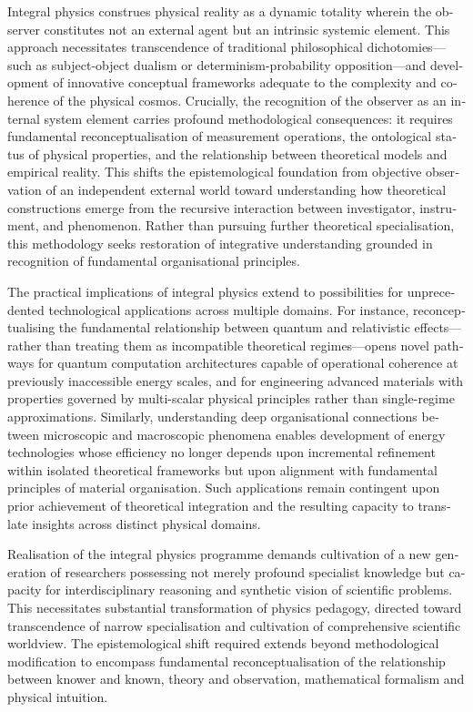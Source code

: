 \begin{english}
    Integral physics construes physical reality as a dynamic totality wherein the observer constitutes not an external agent but an intrinsic systemic element. This approach necessitates transcendence of traditional philosophical dichotomies—such as subject-object dualism or determinism-probability opposition—and development of innovative conceptual frameworks adequate to the complexity and coherence of the physical cosmos. Crucially, the recognition of the observer as an internal system element carries profound methodological consequences: it requires fundamental reconceptualisation of measurement operations, the ontological status of physical properties, and the relationship between theoretical models and empirical reality. This shifts the epistemological foundation from objective observation of an independent external world toward understanding how theoretical constructions emerge from the recursive interaction between investigator, instrument, and phenomenon. Rather than pursuing further theoretical specialisation, this methodology seeks restoration of integrative understanding grounded in recognition of fundamental organisational principles.

    The practical implications of integral physics extend to possibilities for unprecedented technological applications across multiple domains. For instance, reconceptualising the fundamental relationship between quantum and relativistic effects—rather than treating them as incompatible theoretical regimes—opens novel pathways for quantum computation architectures capable of operational coherence at previously inaccessible energy scales, and for engineering advanced materials with properties governed by multi-scalar physical principles rather than single-regime approximations. Similarly, understanding deep organisational connections between microscopic and macroscopic phenomena enables development of energy technologies whose efficiency no longer depends upon incremental refinement within isolated theoretical frameworks but upon alignment with fundamental principles of material organisation. Such applications remain contingent upon prior achievement of theoretical integration and the resulting capacity to translate insights across distinct physical domains.

    Realisation of the integral physics programme demands cultivation of a new generation of researchers possessing not merely profound specialist knowledge but capacity for interdisciplinary reasoning and synthetic vision of scientific problems. This necessitates substantial transformation of physics pedagogy, directed toward transcendence of narrow specialisation and cultivation of comprehensive scientific worldview. The epistemological shift required extends beyond methodological modification to encompass fundamental reconceptualisation of the relationship between knower and known, theory and observation, mathematical formalism and physical intuition.


\end{english}
